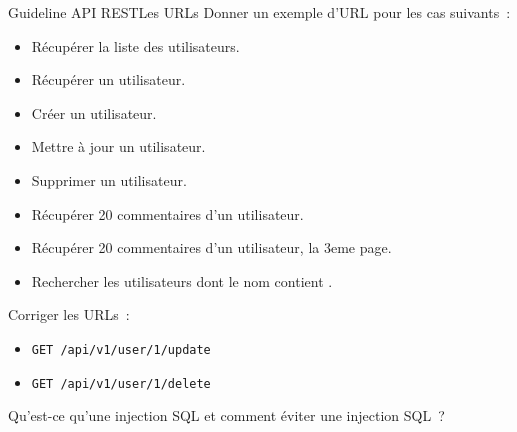 \documentclass{beamer}
\begin{document}
    \begin{frame}{Guideline API REST}{Les URLs}
        Donner un exemple d'URL pour les cas suivants~:
        \begin{itemize}
            \item Récupérer la liste des utilisateurs.
            \item Récupérer un utilisateur.
            \item Créer un utilisateur.
            \item Mettre à jour un utilisateur.
            \item Supprimer un utilisateur.
            \item Récupérer 20 commentaires d'un utilisateur.
            \item Récupérer 20 commentaires d'un utilisateur, la 3eme page.
            \item Rechercher les utilisateurs dont le nom contient .
        \end{itemize}
        \pause
        \bigbreak
        Corriger les URLs~:
        \begin{itemize}
            \item \lstinline{GET /api/v1/user/1/update}
            \item \lstinline{GET /api/v1/user/1/delete}
        \end{itemize}
        \pause
        \bigbreak
        Qu'est-ce qu'une injection SQL et comment éviter une injection SQL~?
    \end{frame}
\end{document}
